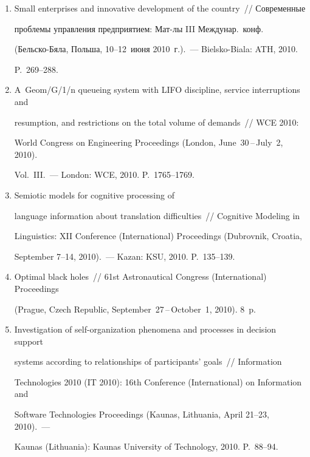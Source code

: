 \begin{enumerate}[1.]
\item {}


Small enterprises and innovative development of the country~/\!\!/  Современные 


проблемы управления предприятием: Мат-лы III Междунар.\ конф.\ 


(Бельско-Бяла, Польша, 10--12~июня 2010~г.).~--- Bielsko-Biala: ATH, 2010. 


P.~269--288.


\item {}


A~Geom/G/1/n queueing system with LIFO discipline, service interruptions and 


resumption, and restrictions on the total volume of demands~/\!\!/  WCE 2010:  


World Congress on Engineering Proceedings (London, June~30\,--\,July~2, 2010). 


Vol.~III.~--- London: WCE, 2010. P.~1765--1769.


\item {} Semiotic models for cognitive processing of 


language information about translation difficulties~/\!\!/  Cognitive Modeling in 


Linguistics:  XII Conference (International) Proceedings (Dubrovnik, Croatia, 


September 7--14, 2010).~--- Kazan: KSU, 2010. P.~135--139.


\item {}


Optimal black holes~/\!\!/ 61st Astronautical Congress (International) Proceedings 


(Prague, Czech Republic, September~27\,--\,October~1, 2010). 8~p. 


\item {}


Investigation of self-organization phenomena and processes in decision support 


systems according to relationships of participants' goals~/\!\!/  Information 


Technologies 2010 (IT 2010): 16th Conference (International) on Information and 


Software Technologies Proceedings (Kaunas, Lithuania, April 21--23, 2010).~--- 


Kaunas (Lithuania): Kaunas University of Technology, 2010. P.~88--94.



\end{enumerate}

